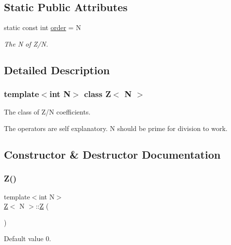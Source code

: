 \subsection*{Static Public Attributes}
\begin{DoxyCompactItemize}
\item 
static const int \hyperlink{classZ_a8da63061091de9ee7a146a856f70c4b8}{order} = N
\begin{DoxyCompactList}\small\item\em The N of Z/N. \end{DoxyCompactList}\end{DoxyCompactItemize}


\subsection{Detailed Description}
\subsubsection*{template$<$int N$>$\newline
class Z$<$ N $>$}

The class of Z/N coefficients. 

The operators are self explanatory. N should be prime for division to work. 

\subsection{Constructor \& Destructor Documentation}
\mbox{\label{classZ_a21a5a03bc44e0a76607d1b89dc9e31cb}} 
\subsubsection{\texorpdfstring{Z()}{Z()}\hspace{0.1cm}{\footnotesize\ttfamily [1/4]}}
{\footnotesize\ttfamily template$<$int N$>$ \\
\hyperlink{classZ}{Z}$<$ N $>$\+::\hyperlink{classZ}{Z} (\begin{DoxyParamCaption}{ }\end{DoxyParamCaption})\hspace{0.3cm}{\ttfamily [inline]}}



Default value 0. 

\mbox{\label{classZ_aa6546d6135c97a5b8df9028068dfe0c1}} 
